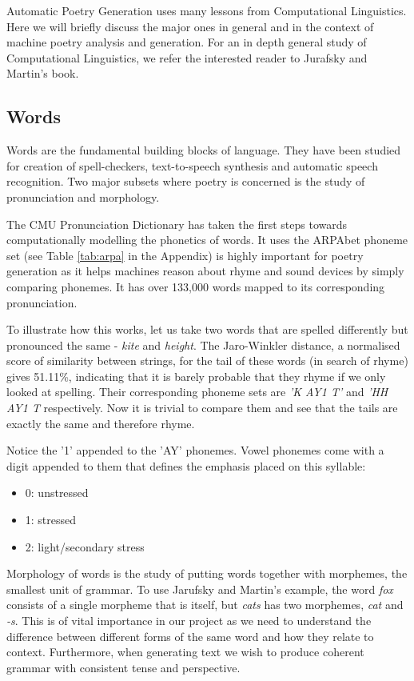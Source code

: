Automatic Poetry Generation uses many lessons from Computational Linguistics. Here we will briefly discuss the major ones in general and in the context of machine poetry analysis and generation. For an in depth general study of Computational Linguistics, we refer the interested reader to Jurafsky and Martin's book.

\subsection{Words}
\label{sec:words}
Words are the fundamental building blocks of language. They have been studied for creation of spell-checkers, text-to-speech synthesis and automatic speech recognition. Two major subsets where poetry is concerned is the study of pronunciation and morphology. 

The CMU Pronunciation Dictionary\cite{weide1998cmu} has taken the first steps towards computationally modelling the phonetics of words. It uses the ARPAbet phoneme set (see Table \ref{tab:arpa} in the Appendix) is highly important for poetry generation as it helps machines reason about rhyme and sound devices by simply comparing phonemes. It has over 133,000 words mapped to its corresponding pronunciation.

To illustrate how this works, let us take two words that are spelled differently but pronounced the same - \textit{kite} and \textit{height}. The Jaro-Winkler distance, a normalised score of similarity between strings, for the tail of these words (in search of rhyme) gives 51.11\%, indicating that it is barely probable that they rhyme if we only looked at spelling. Their corresponding phoneme sets are \textit{'K AY1 T'} and \textit{'HH AY1 T} respectively. Now it is trivial to compare them and see that the tails are exactly the same and therefore rhyme.

Notice the '1' appended to the 'AY' phonemes. Vowel phonemes come with a digit appended to them that defines the emphasis placed on this syllable:
\begin{itemize}
\item{0: unstressed}
\item{1: stressed}
\item{2: light/secondary stress}
\end{itemize}

Morphology of words is the study of putting words together with morphemes, the smallest unit of grammar. To use Jarufsky and Martin's example, the word \textit{fox} consists of a single morpheme that is itself, but \textit{cats} has two morphemes, \textit{cat} and \textit{-s}. This is of vital importance in our project as we need to understand the difference between different forms of the same word and how they relate to context. Furthermore, when generating text we wish to produce coherent grammar with consistent tense and perspective.

